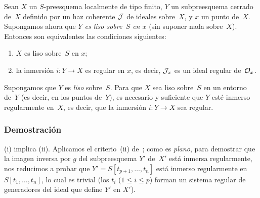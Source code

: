 
\begin{theoreme}
\label{II.4.15}
Sean $X$ un $S$-preesquema localmente de tipo finito, $Y$ un subpreesquema cerrado de~$X$ definido por un haz coherente $\cal{J}$ de ideales sobre~$X$, y $x$ un punto de~$X$. Supongamos ahora que \emph{$Y$ es liso sobre~$S$ en $x$} (sin suponer nada sobre~$X$). Entonces son equivalentes las condiciones siguientes:
\begin{enumerate}
\item[(i)] $X$ es liso sobre~$S$ en $x$;
\item[(ii)] la inmersión $i\colon Y\to X$ es regular en $x$, es decir, $\cal{J}_x$ es un ideal regular de~$\cal{O}_x$.
\end{enumerate}
\end{theoreme}

\begin{corollaire}
\label{II.4.16}
Supongamos que $Y$ es \emph{liso} sobre~$S$. Para que $X$ sea liso sobre~$S$ en un entorno de~$Y$ (es decir, en los puntos de~$Y$), es necesario y suficiente que $Y$ esté inmerso regularmente en~$X$, es decir, que la inmersión $i\colon Y\to X$ sea regular.
\end{corollaire}

\subsubsection*{Demostración}
(i) implica (ii). Aplicamos el criterio~(ii) de~; como
es \emph{plano}, para demostrar que la imagen inversa por $g$ del subpreesquema $Y'$ de~$X'$ está inmersa regularmente, nos reducimos a probar que $Y'=S[t_{p+1},\dots,t_n]$ está inmerso regularmente en $S[t_1,\dots,t_n]$, lo cual es trivial (los $t_i$ ($1\leq i\leq p$) forman un sistema regular de generadores del ideal que define $Y'$ en $X'$).

